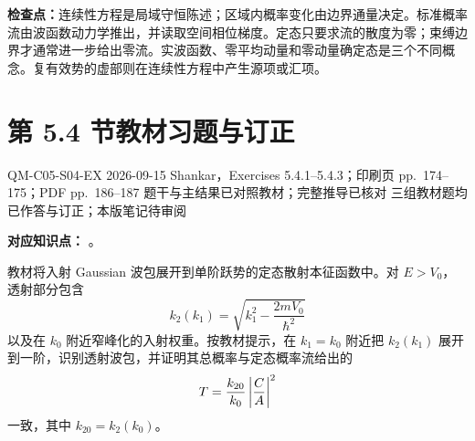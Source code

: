 \textbf{检查点：}连续性方程是局域守恒陈述；区域内概率变化由边界通量决定。标准概率流由波函数动力学推出，并读取空间相位梯度。定态只要求流的散度为零；束缚边界才通常进一步给出零流。实波函数、零平均动量和零动量确定态是三个不同概念。复有效势的虚部则在连续性方程中产生源项或汇项。

\section{第 5.4 节教材习题与订正}
\label{exercise-set:QM-C05-S04}

\exercisemeta
  {QM-C05-S04-EX}
  {2026-09-15}
  {Shankar，Exercises 5.4.1--5.4.3；印刷页 pp.~174--175；PDF pp.~186--187}
  {题干与主结果已对照教材；完整推导已核对}
  {三组教材题均已作答与订正；本版笔记待审阅}


\textbf{对应知识点：}
。

教材将入射 Gaussian 波包展开到单阶跃势的定态散射本征函数中。对 $E>V_0$，透射部分包含
\begin{equation}
  k_2(k_1)=\sqrt{k_1^2-\frac{2mV_0}{\hbar^2}}
  \label{eq:QM-C05-S04-E01-k2-definition}
\end{equation}
以及在 $k_0$ 附近窄峰化的入射权重。按教材提示，在 $k_1=k_0$ 附近把 $k_2(k_1)$ 展开到一阶，识别透射波包，并证明其总概率与定态概率流给出的
\begin{equation}
  T=\frac{k_{20}}{k_0}\left|\frac CA\right|^2
\end{equation}
一致，其中 $k_{20}=k_2(k_0)$。

